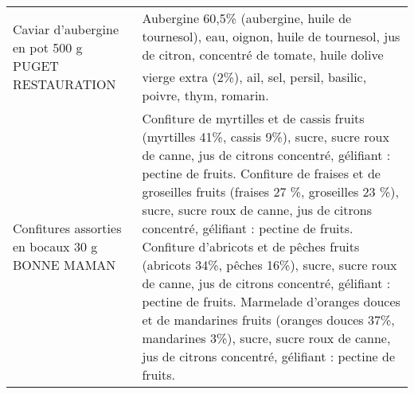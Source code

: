 \begin{longtable}{p{5cm}p{10cm}}
                                                       Caviar d'aubergine en pot 500 g PUGET RESTAURATION &                                                                                                                                                                                                                                                                                                                                                                                                                                                                                                                                                                                                                                                                                                                                                                                                                                 Aubergine 60,5\% (aubergine, huile de tournesol), eau, oignon, huile de tournesol, jus de citron, concentré de tomate, huile dolive vierge extra (2\%), ail, sel, persil, basilic, poivre, thym, romarin. \\
                                                          Confitures assorties en bocaux 30 g BONNE MAMAN &                                                                                                                                                                                                                                                                                                                                                            Confiture de myrtilles et de cassis  fruits (myrtilles 41\%, cassis 9\%), sucre, sucre roux de canne, jus de citrons concentré, gélifiant : pectine de fruits.  Confiture de fraises et de groseilles  fruits (fraises 27 \%, groseilles 23 \%), sucre, sucre roux de canne, jus de citrons concentré, gélifiant : pectine de fruits.  Confiture d'abricots et de pêches  fruits (abricots 34\%, pêches 16\%), sucre, sucre roux de canne, jus de citrons concentré, gélifiant : pectine de fruits.  Marmelade d'oranges douces et de mandarines  fruits (oranges douces 37\%, mandarines 3\%), sucre, sucre roux de canne, jus de citrons  concentré, gélifiant : pectine de fruits. \\

\end{longtable}
